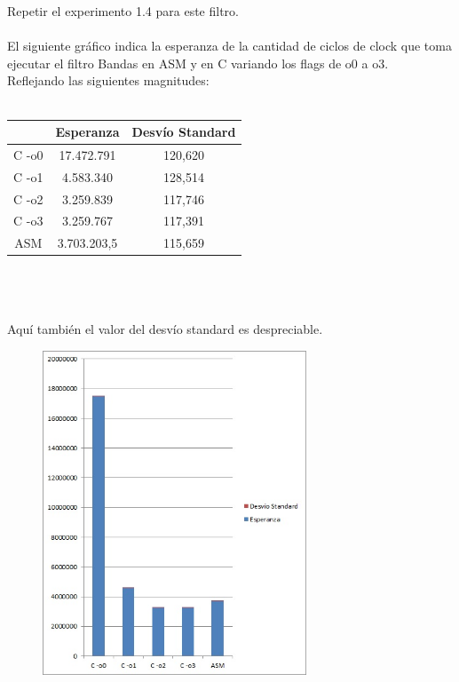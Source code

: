 Repetir el experimento 1.4 para este filtro. \\
\\
El siguiente gr\'afico indica la esperanza de la cantidad de ciclos de clock que toma ejecutar el filtro Bandas en ASM y en C variando los flags de o0 a o3. \\
Reflejando las siguientes magnitudes: \\
\\
 \begin{tabular}[c]{|c|c|c|}
	\hline
		 & Esperanza & Desv\'io Standard\\
		\hline
C -o0 & 17.472.791 & 120,620 \\
\hline
C -o1 & 4.583.340 & 128,514 \\
\hline
C -o2 & 3.259.839 & 117,746 \\
\hline
C -o3 & 3.259.767 & 117,391  \\
\hline
ASM & 3.703.203,5 & 115,659 \\
\hline
	\end{tabular}\\\\
\\
Aqu\'i tambi\'en el valor del desv\'io standard es despreciable. \\
\newpage
\begin{figure}
  \begin{center}
	\includegraphics[width=0.7\textwidth]{imagenes/32.jpg}
  \end{center}
\end{figure}
\newpage

